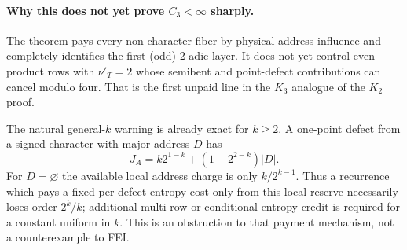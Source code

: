 \paragraph{Why this does not yet prove $C_3<\infty$ sharply.}
The theorem pays every non-character fiber by physical address
influence and completely identifies the first (odd) 2-adic layer.
It does not yet control even product rows with $\nu'_T=2$ whose
semibent and point-defect contributions can cancel modulo four.  That
is the first unpaid line in the $K_3$ analogue of the $K_2$ proof.

The natural general-$k$ warning is already exact for $k\ge2$.  A one-point defect
from a signed character with major address $D$ has
\[
 J_A= k2^{1-k}+(1-2^{2-k})|D|.
\tag{5}
\]
For $D=\varnothing$ the available local address charge is only
$k/2^{k-1}$.  Thus a recurrence which pays a fixed per-defect entropy
cost only from this local reserve necessarily loses order $2^k/k$;
additional multi-row or conditional entropy credit is required for a
constant uniform in $k$.  This is an obstruction to that payment
mechanism, not a counterexample to FEI.
